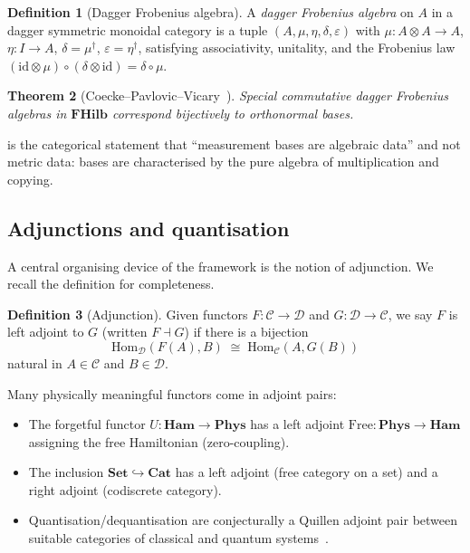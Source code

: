 \documentclass[12pt]{article}
\newtheorem{theorem}{Theorem}[section]
\theoremstyle{definition}
\newtheorem{definition}[theorem]{Definition}
\theoremstyle{remark}
\newcommand{\C}{\mathcal{C}}
\newcommand{\D}{\mathcal{D}}
\newcommand{\Phys}{\mathbf{Phys}}
\newcommand{\FHilb}{\mathbf{FHilb}}
\newcommand{\Set}{\mathbf{Set}}
\newcommand{\id}{\mathrm{id}}
\newcommand{\Hom}{\mathrm{Hom}}
\begin{document}
\begin{definition}[Dagger Frobenius algebra]
A \emph{dagger Frobenius algebra} on $A$ in a dagger symmetric monoidal category is a tuple $(A, \mu, \eta, \delta, \varepsilon)$ with $\mu : A \otimes A \to A$, $\eta : I \to A$, $\delta = \mu^\dagger$, $\varepsilon = \eta^\dagger$, satisfying associativity, unitality, and the Frobenius law $(\id \otimes \mu) \circ (\delta \otimes \id) = \delta \circ \mu$.
\end{definition}

\begin{theorem}[Coecke--Pavlovic--Vicary~\cite{abramskycoecke2004}]
\label{thm:cpv}
Special commutative dagger Frobenius algebras in $\FHilb$ correspond bijectively to orthonormal bases.
\end{theorem}

 is the categorical statement that ``measurement bases are algebraic data'' and not metric data: bases are characterised by the pure algebra of multiplication and copying.

\subsection{Adjunctions and quantisation}

A central organising device of the framework is the notion of adjunction. We recall the definition for completeness.

\begin{definition}[Adjunction]
\label{def:adjunction}
Given functors $F : \C \to \D$ and $G : \D \to \C$, we say $F$ is left adjoint to $G$ (written $F \dashv G$) if there is a bijection
\[
\Hom_\D(F(A), B) \;\cong\; \Hom_\C(A, G(B))
\]
natural in $A \in \C$ and $B \in \D$.
\end{definition}

Many physically meaningful functors come in adjoint pairs:
\begin{itemize}
\item The forgetful functor $U : \mathbf{Ham} \to \Phys$ has a left adjoint $\mathrm{Free} : \Phys \to \mathbf{Ham}$ assigning the free Hamiltonian (zero-coupling).
\item The inclusion $\Set \hookrightarrow \mathbf{Cat}$ has a left adjoint (free category on a set) and a right adjoint (codiscrete category).
\item Quantisation/dequantisation are conjecturally a Quillen adjoint pair between suitable categories of classical and quantum systems~\cite{lawvere1969}.
\end{itemize}
\end{document}
